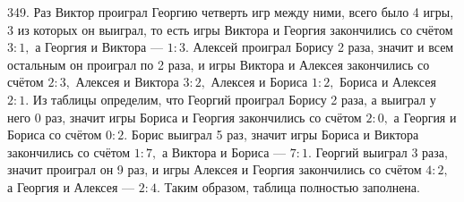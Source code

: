 349. Раз Виктор проиграл Георгию четверть игр между ними, всего было 4 игры, 3 из которых он выиграл, то есть игры Виктора и Георгия закончились со счётом $3:1,$ а Георгия и Виктора --- $1:3.$ Алексей проиграл Борису 2 раза, значит и всем остальным он проиграл по 2 раза, и игры Виктора и Алексея закончились со счётом $2:3,$ Алексея и Виктора $3:2,$ Алексея и Бориса $1:2,$ Бориса и Алексея $2:1.$ Из таблицы определим, что Георгий проиграл Борису 2 раза, а выиграл у него 0 раз, значит игры Бориса и Георгия закончились со счётом $2:0,$ а Георгия и Бориса со счётом $0:2.$ Борис выиграл 5 раз, значит игры Бориса и Виктора закончились со счётом $1:7,$ а Виктора и Бориса --- $7:1.$ Георгий выиграл 3 раза, значит проиграл он 9 раз, и игры Алексея и Георгия закончились со счётом $4:2,$ а Георгия и Алексея --- $2:4.$ Таким образом, таблица полностью заполнена.
\begin{figure}[ht!]
\end{figure}\\
